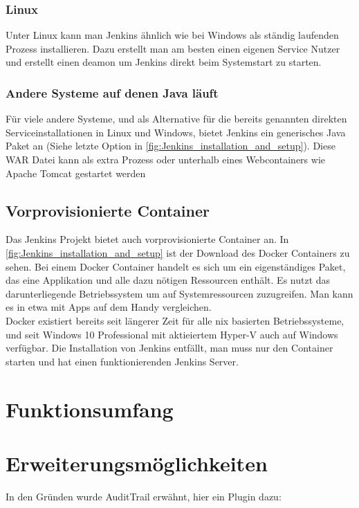 \subsubsection*{Linux}
Unter Linux kann man Jenkins ähnlich wie bei Windows als ständig laufenden Prozess installieren. Dazu erstellt man am besten einen eigenen Service Nutzer  und erstellt einen deamon um Jenkins direkt beim Systemstart zu starten. \cite{jenkins-installing}
\subsubsection*{Andere Systeme auf denen Java läuft}
Für viele andere Systeme, und als Alternative für die bereits genannten direkten Serviceinstallationen in Linux und Windows, bietet Jenkins ein generisches Java Paket an (Siehe letzte Option in \autoref{fig:Jenkins_installation_and_setup}). Diese WAR Datei kann als extra Prozess oder unterhalb eines Webcontainers wie Apache Tomcat gestartet werden \cite{jenkins-installing}
\subsection{Vorprovisionierte Container}
Das Jenkins Projekt bietet auch vorprovisionierte Container an. In \autoref{fig:Jenkins_installation_and_setup} ist der Download des Docker Containers zu sehen. Bei einem Docker Container handelt es sich um ein eigenständiges Paket, das eine Applikation und alle dazu nötigen Ressourcen enthält. Es nutzt das darunterliegende Betriebssystem um auf Systemressourcen zuzugreifen. Man kann es in etwa mit Apps auf dem Handy vergleichen.\\
Docker existiert bereits seit längerer Zeit für alle \*nix basierten Betriebssysteme, und seit Windows 10 Professional mit aktieiertem Hyper-V auch auf Windows verfügbar. Die Installation von Jenkins entfällt, man muss nur den Container starten und hat einen funktionierenden Jenkins Server.
\section{Funktionsumfang}
\section{Erweiterungsmöglichkeiten}
In den Gründen wurde AuditTrail erwähnt, hier ein Plugin dazu: \cite{jenkins-audit-trail}
